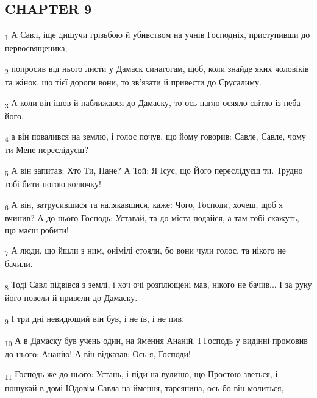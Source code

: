 \subsection{CHAPTER 9}
\begin{tcolorbox}
\textsubscript{1} А Савл, іще дишучи грізьбою й убивством на учнів Господніх, приступивши до первосвященика,
\end{tcolorbox}
\begin{tcolorbox}
\textsubscript{2} попросив від нього листи у Дамаск синагогам, щоб, коли знайде яких чоловіків та жінок, що тієї дороги вони, то зв'язати й привести до Єрусалиму.
\end{tcolorbox}
\begin{tcolorbox}
\textsubscript{3} А коли він ішов й наближався до Дамаску, то ось нагло осяяло світло із неба його,
\end{tcolorbox}
\begin{tcolorbox}
\textsubscript{4} а він повалився на землю, і голос почув, що йому говорив: Савле, Савле, чому ти Мене переслідуєш?
\end{tcolorbox}
\begin{tcolorbox}
\textsubscript{5} А він запитав: Хто Ти, Пане? А Той: Я Ісус, що Його переслідуєш ти. Трудно тобі бити ногою колючку!
\end{tcolorbox}
\begin{tcolorbox}
\textsubscript{6} А він, затрусившися та налякавшися, каже: Чого, Господи, хочеш, щоб я вчинив? А до нього Господь: Уставай, та до міста подайся, а там тобі скажуть, що маєш робити!
\end{tcolorbox}
\begin{tcolorbox}
\textsubscript{7} А люди, що йшли з ним, онімілі стояли, бо вони чули голос, та нікого не бачили.
\end{tcolorbox}
\begin{tcolorbox}
\textsubscript{8} Тоді Савл підвівся з землі, і хоч очі розплющені мав, нікого не бачив... І за руку його повели й привели до Дамаску.
\end{tcolorbox}
\begin{tcolorbox}
\textsubscript{9} І три дні невидющий він був, і не їв, і не пив.
\end{tcolorbox}
\begin{tcolorbox}
\textsubscript{10} А в Дамаску був учень один, на ймення Ананій. І Господь у видінні промовив до нього: Ананію! А він відказав: Ось я, Господи!
\end{tcolorbox}
\begin{tcolorbox}
\textsubscript{11} Господь же до нього: Устань, і піди на вулицю, що Простою зветься, і пошукай в домі Юдовім Савла на ймення, тарсянина, ось бо він молиться,
\end{tcolorbox}

